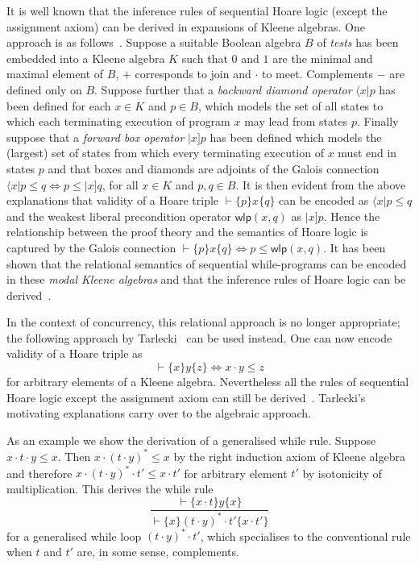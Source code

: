 \documentclass{llncs}
\begin{document}
It is well known that the inference rules of sequential Hoare logic
(except the assignment axiom) can be derived in expansions of Kleene
algebras. One approach is as
follows~\cite{moller_algebras_2006}. Suppose a suitable Boolean
algebra $B$ of \emph{tests} has been embedded into a Kleene algebra
$K$ such that $0$ and $1$ are the minimal and maximal element of $B$,
$+$ corresponds to join and $\cdot$ to meet. Complements $-$ are
defined only on $B$. Suppose further that a \emph{backward diamond
  operator} $\langle x|p$ has been defined for each $x\in K$ and $p\in
B$, which models the set of all states to which each terminating
execution of program $x$ may lead from states $p$. Finally suppose
that a \emph{forward box operator} $|x]p$ has been defined which
models the (largest) set of states from which every terminating
execution of $x$ must end in states $p$ and that boxes and diamonds
are adjoints of the Galois connection $\langle x|p \le q
\Leftrightarrow p \le |x]q$, for all $x\in K$ and $p,q\in B$. It is
then evident from the above explanations that validity of a Hoare
triple $\vdash \{p\}x\{q\}$ can be encoded as $\langle x|p \le q$ and
the weakest liberal precondition operator $\mathsf{wlp}(x,q)$ as
$|x]p$. Hence the relationship between the proof theory and the
semantics of Hoare logic is captured by the Galois connection $
\vdash\{p\}x\{q\} \Leftrightarrow p \le \mathsf{wlp}(x,q)$. It has
been shown that the relational semantics of sequential while-programs
can be encoded in these \emph{modal Kleene algebras} and that the
inference rules of Hoare logic can be
derived~\cite{moller_algebras_2006}.

In the context of concurrency, this relational approach is no longer
appropriate; the following approach by
Tarlecki~\cite{tarlecki_language_1985} can be used instead. One can
now encode validity of a Hoare triple as
\begin{equation*}
  \vdash \{x\}y\{z\} \Leftrightarrow x \cdot y \le z
\end{equation*}
for arbitrary elements of a Kleene algebra. Nevertheless all the
rules of sequential Hoare logic except the assignment axiom can still
be derived~\cite{hoare_concurrent_2011}. Tarlecki's motivating
explanations carry over to the algebraic approach.

As an example we show the derivation of a generalised while
rule. Suppose $x\cdot t\cdot y\le x$. Then $x\cdot (t\cdot y)^\ast \le
x$ by the right induction axiom of Kleene algebra and therefore
$x\cdot (t\cdot y)^\ast\cdot t'\le x\cdot t'$ for arbitrary element $t'$ by
isotonicity of multiplication. This derives the while rule
\begin{equation*}
  \frac{\vdash \{x\cdot t\}y\{x\}}{\vdash \{x\}(t\cdot y)^\ast\cdot t'\{x\cdot t'\}}
\end{equation*}
for a generalised while loop $(t\cdot y)^\ast\cdot t'$, which
specialises to the conventional rule when $t$ and $t'$ are, in some
sense, complements.
\end{document}
